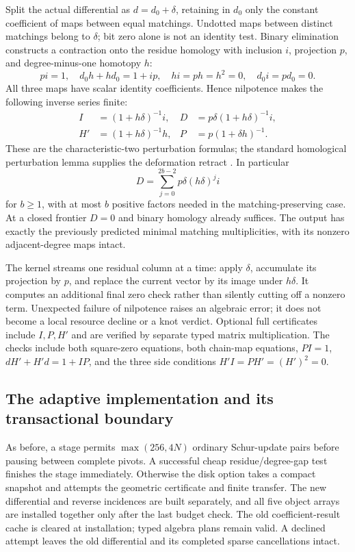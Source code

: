Split the actual differential as $d=d_0+\delta$, retaining in $d_0$ only
the constant coefficient of maps between equal matchings. Undotted maps
between distinct matchings belong to $\delta$; bit zero alone is not an
identity test. Binary elimination constructs a contraction onto the residue
homology with inclusion $i$, projection $p$, and degree-minus-one homotopy $h$:
\[
 pi=1,\quad d_0h+hd_0=1+ip,\quad hi=ph=h^2=0,\quad d_0i=pd_0=0.
\]
All three maps have scalar identity coefficients. Hence nilpotence makes
the following inverse series finite:
\begin{align*}
 I&=(1+h\delta)^{-1}i,&
 D&=p\delta(1+h\delta)^{-1}i,\\
 H'&=(1+h\delta)^{-1}h,&
 P&=p(1+\delta h)^{-1}.
\end{align*}
These are the characteristic-two perturbation formulas; the standard
homological perturbation lemma supplies the deformation retract
\cite{crainic-perturbation}. In particular
\[
 D=\sum_{j=0}^{2b-2}p\delta(h\delta)^ji
\]
for $b\ge1$, with at most $b$ positive factors needed in the
matching-preserving case. At a closed frontier $D=0$ and binary homology
already suffices. The output has exactly the previously predicted minimal
matching multiplicities, with its nonzero adjacent-degree maps intact.

The kernel streams one residual column at a time: apply $\delta$, accumulate
its projection by $p$, and replace the current vector by its image under
$h\delta$. It computes an additional final zero check rather than silently
cutting off a nonzero term. Unexpected failure of nilpotence raises an
algebraic error; it does not become a local resource decline or a knot verdict.
Optional full certificates include $I,P,H'$ and are verified by separate
typed matrix multiplication. The checks include both square-zero equations,
both chain-map equations, $PI=1$, $dH'+H'd=1+IP$, and the three side
conditions $H'I=PH'=(H')^2=0$.

\subsection{The adaptive implementation and its transactional boundary}
As before, a stage permits $\max(256,4N)$ ordinary Schur-update pairs before
pausing between complete pivots. A successful cheap residue/degree-gap test
finishes the stage immediately. Otherwise the disk option takes a compact
snapshot and attempts the geometric certificate and finite transfer.
The new differential and reverse incidences are built separately, and all
five object arrays are installed together only after the last budget check.
The old coefficient-result cache is cleared at installation; typed algebra
plans remain valid. A declined attempt leaves the old differential and its
completed sparse cancellations intact.

